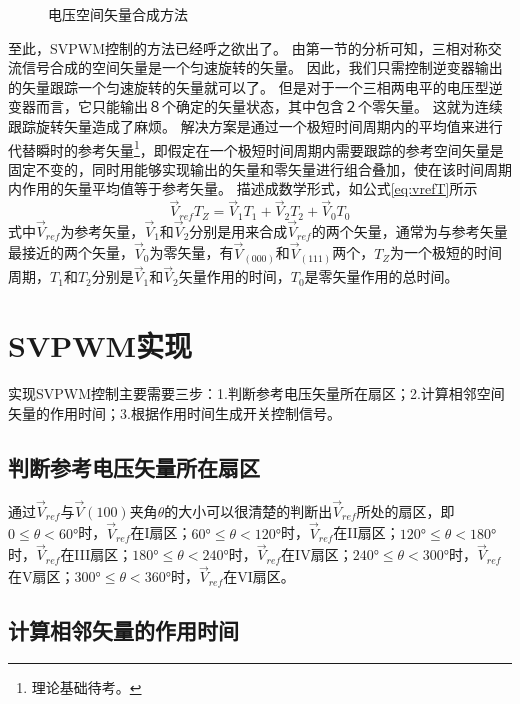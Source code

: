 \documentclass{ctexart}
\numberwithin{equation}{section}
\begin{document}
\begin{figure}[htb]
  \centering
  \def\svgwidth{.5\columnwidth}
  
  \caption{电压空间矢量合成方法}
  \label{fig:space-vector}
\end{figure}

至此，SVPWM控制的方法已经呼之欲出了。
由第一节的分析可知，三相对称交流信号合成的空间矢量是一个匀速旋转的矢量。
因此，我们只需控制逆变器输出的矢量跟踪一个匀速旋转的矢量就可以了。
但是对于一个三相两电平的电压型逆变器而言，它只能输出８个确定的矢量状态，其中包含２个零矢量。
这就为连续跟踪旋转矢量造成了麻烦。
解决方案是通过一个极短时间周期内的平均值来进行代替瞬时的参考矢量\footnote{理论基础待考。
}，即假定在一个极短时间周期内需要跟踪的参考空间矢量是固定不变的，同时用能够实现输出的矢量和零矢量进行组合叠加，使在该时间周期内作用的矢量平均值等于参考矢量。
描述成数学形式，如公式\ref{eq:vrefT}所示
\begin{equation}
  \vec V_{ref}T_Z= \vec V_1 T_1 + \vec V_2 T_2 + \vec V_0 T_0
  \label{eq:vrefT}
\end{equation}
式中$\vec V_{ref}$为参考矢量，$\vec V_1$和$\vec V_2$分别是用来合成$\vec V_{ref}$的两个矢量，通常为与参考矢量最接近的两个矢量，$\vec V_{0}$为零矢量，有$\vec V_{(000)}$和$\vec V_{(111)}$两个，$T_Z$为一个极短的时间周期，$T_1$和$T_2$分别是$\vec V_1$和$\vec V_2$矢量作用的时间，$T_0$是零矢量作用的总时间。

\section{SVPWM实现}
实现SVPWM控制主要需要三步：1.判断参考电压矢量所在扇区；2.计算相邻空间矢量的作用时间；3.根据作用时间生成开关控制信号。

\subsection{判断参考电压矢量所在扇区}

通过$ \vec{V}_{ref} $与$ \vec{V}{(100)} $夹角$ \theta $的大小可以很清楚的判断出$ \vec V_{ref} $所处的扇区，即$0\leq \theta<\ang{60}$时，$ \vec V_{ref} $在I扇区；$\ang{60} \leq \theta<\ang{120}$时，$ \vec V_{ref} $在II扇区；$\ang{120} \leq \theta<\ang{180}$时，$ \vec V_{ref} $在III扇区；$\ang{180} \leq \theta<\ang{240}$时，$ \vec V_{ref} $在IV扇区；$\ang{240} \leq \theta<\ang{300}$时，$ \vec V_{ref} $在V扇区；$\ang{300}\leq \theta<\ang{360}$时，$ \vec V_{ref} $在VI扇区。

\subsection{计算相邻矢量的作用时间}
\end{document}
